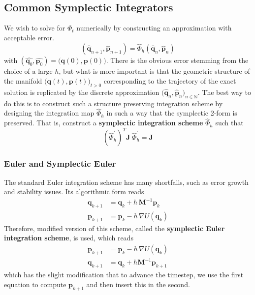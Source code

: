   \subsection{Common Symplectic Integrators}

    We wish to solve for $\Phi_t$ numerically by constructing an approximation with acceptable error. 
    \begin{equation}
      (\hat{\mathbf{q}}_{n+1}, \hat{\mathbf{p}}_{n+1}) = \hat{\Phi}_{h} (\hat{\mathbf{q}}_{n}, \hat{\mathbf{p}}_{n})
    \end{equation}
    with $(\hat{\mathbf{q}_0}, \hat{\mathbf{p}_0}) = \big( \mathbf{q}(0), \mathbf{p}(0)\big)$. There is the obvious error stemming from the choice of a large $h$, but what is more important is that the geometric structure of the manifold $\big( \mathbf{q}(t), \mathbf{p}(t)\big)_{t > 0}$ corresponding to the trajectory of the exact solution is replicated by the discrete approximation $\big(\hat{\mathbf{q}}_n, \hat{\mathbf{p}}_n\big)_{n \in \mathbb{N}}$. The best way to do this is to construct such a structure preserving integration scheme by designing the integration map $\hat{\Phi}_{h}$ in such a way that the symplectic 2-form is preserved. That is, construct a \textbf{symplectic integration scheme} $\hat{\Phi}_{h}$ such that 
    \begin{equation}
      (\hat{\Phi}_{h}^\prime)^T \mathbf{J} \; \hat{\Phi}_{h}^\prime = \mathbf{J}
    \end{equation}

    \subsubsection{Euler and Symplectic Euler}

      The standard Euler integration scheme has many shortfalls, such as error growth and stability issues. Its algorithmic form reads 
      \begin{align*}
        \mathbf{q}_{k + 1} & = \mathbf{q}_k + h \, \mathbf{M}^{-1} \mathbf{p}_k \\
        \mathbf{p}_{k + 1} & = \mathbf{p}_k - h \, \nabla U(\mathbf{q}_k)
      \end{align*}
      Therefore, modified version of this scheme, called the \textbf{symplectic Euler integration scheme}, is used, which reads 
      \begin{align*}
        \mathbf{p}_{k+1} & = \mathbf{p}_k - h \, \nabla U(\mathbf{q}_k) \\
        \mathbf{q}_{k+1} & = \mathbf{q}_k + h \mathbf{M}^{-1} \mathbf{p}_{k+1} 
      \end{align*}
      which has the slight modification that to advance the timestep, we use the first equation to compute $\mathbf{p}_{k+1}$ and then insert this in the second. 

